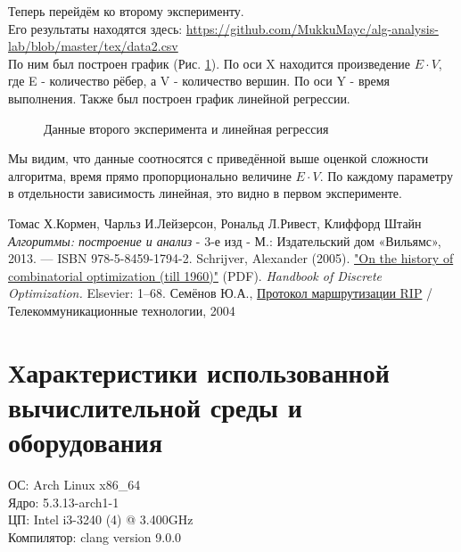 \documentclass[a4paper,12pt]{article}
\begin{document}
Теперь перейдём ко второму эксперименту. \\
Его результаты находятся здесь:
\url{https://github.com/MukkuMayc/alg-analysis-lab/blob/master/tex/data2.csv} \\
По ним был построен график (Рис. \ref{data_and_regression}). По оси X находится произведение $E \cdot V$, где E - количество рёбер, а V - количество вершин.
По оси Y - время выполнения. Также был построен график линейной регрессии.

\begin{figure}[H]
  \centering
  \def\svgwidth{\columnwidth}
  
  \caption{Данные второго эксперимента и линейная регрессия}
  \label{data_and_regression}
\end{figure}

Мы видим, что данные соотносятся с приведённой выше оценкой сложности алгоритма,
время прямо пропорционально величине $E \cdot V$.
По каждому параметру в отдельности зависимость линейная, это видно в первом эксперименте.
\begin{thebibliography}{9}
    Томас Х.Кормен, Чарльз И.Лейзерсон, Рональд Л.Ривест, Клиффорд Штайн
    \textit{Алгоритмы: построение и анализ}
    - 3-е изд - М.: Издательский дом «Вильямс», 2013. — ISBN 978-5-8459-1794-2.
    Schrijver, Alexander (2005).
    \href{https://homepages.cwi.nl/~lex/files/histco.pdf}
    {"On the history of combinatorial optimization (till 1960)"} (PDF).
    \textit{Handbook of Discrete Optimization.} Elsevier: 1–68.
    Семёнов Ю.А.,
    \href{http://citforum.ru/nets/semenov/4/44/rip44111.shtml}{Протокол маршрутизации RIP}
    / Телекоммуникационные технологии, 2004
\end{thebibliography}
\section{Характеристики использованной вычислительной среды и оборудования}
ОС: Arch Linux x86\_64 \\
Ядро: 5.3.13-arch1-1 \\
ЦП: Intel i3-3240 (4) @ 3.400GHz \\
Компилятор: clang version 9.0.0
\end{document}
